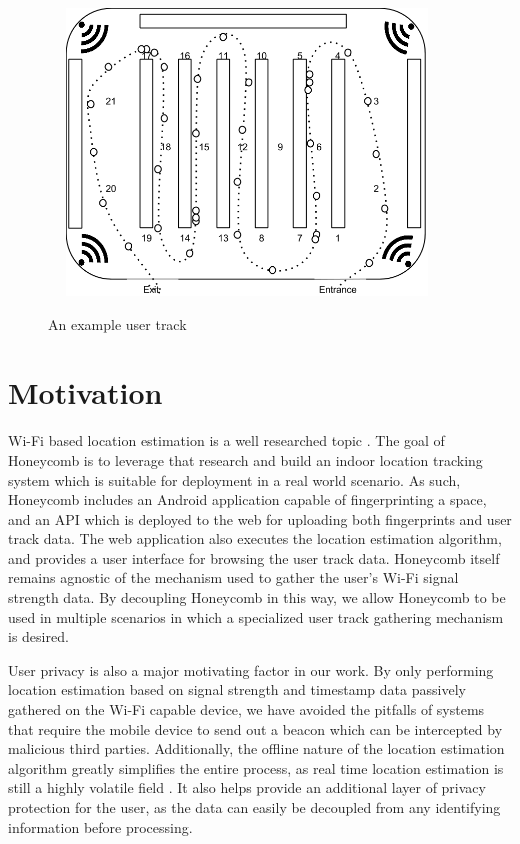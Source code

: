 \begin{figure}[htb] %
	\begin{center}
		\ \includegraphics[width=4in,height=3in]{ExampleUserTrack.png}
		\caption{An example user track}
		\label{usertrackexample}
	\end{center}
\end{figure}


\section{Motivation}
%

Wi-Fi based location estimation is a well researched topic \cite{liu2007survey}. The goal of Honeycomb is to leverage that research and build an indoor location tracking system which is suitable for deployment in a real world scenario.  As such, Honeycomb includes an Android application capable of fingerprinting a space, and an API which is deployed to the web for uploading both fingerprints and user track data. The web application also executes the location estimation algorithm, and provides a user interface for browsing the user track data. Honeycomb itself remains agnostic of the mechanism used to gather the user's Wi-Fi signal strength data. By decoupling Honeycomb in this way, we allow Honeycomb to be used in multiple scenarios in which a specialized user track gathering mechanism is desired. 

User privacy is also a major motivating factor in our work. By only performing location estimation based on signal strength and timestamp data passively gathered on the Wi-Fi capable device, we have avoided the pitfalls of systems that require the mobile device to send out a beacon \cite{ito2005bayesian} \cite{xiong2012towards} which can be intercepted by malicious third parties. Additionally, the offline nature of the location estimation algorithm greatly simplifies the entire process, as real time location estimation is still a highly volatile field \cite{turner2011empirical}. It also helps provide an additional layer of privacy protection for the user, as the data can easily be decoupled from any identifying information before processing.
 
